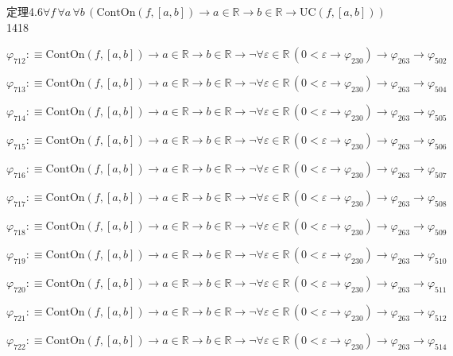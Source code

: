 \begin{fullproof}{定理4.6}{$\forall f\,\forall a\,\forall b\,(\mathrm{ContOn}(f,[a,b]) \to a \in \mathbb{R} \to b \in \mathbb{R} \to \mathrm{UC}(f,[a,b]))$}{1418}
\begin{abbrevlist}
\item $\varphi_{712} :\equiv \mathrm{ContOn}(f,[a,b]) \to a \in \mathbb{R} \to b \in \mathbb{R} \to \neg \forall \varepsilon \in \mathbb{R}\,(0 < \varepsilon \to \varphi_{230}) \to \varphi_{263} \to \varphi_{502}$
\item $\varphi_{713} :\equiv \mathrm{ContOn}(f,[a,b]) \to a \in \mathbb{R} \to b \in \mathbb{R} \to \neg \forall \varepsilon \in \mathbb{R}\,(0 < \varepsilon \to \varphi_{230}) \to \varphi_{263} \to \varphi_{504}$
\item $\varphi_{714} :\equiv \mathrm{ContOn}(f,[a,b]) \to a \in \mathbb{R} \to b \in \mathbb{R} \to \neg \forall \varepsilon \in \mathbb{R}\,(0 < \varepsilon \to \varphi_{230}) \to \varphi_{263} \to \varphi_{505}$
\item $\varphi_{715} :\equiv \mathrm{ContOn}(f,[a,b]) \to a \in \mathbb{R} \to b \in \mathbb{R} \to \neg \forall \varepsilon \in \mathbb{R}\,(0 < \varepsilon \to \varphi_{230}) \to \varphi_{263} \to \varphi_{506}$
\item $\varphi_{716} :\equiv \mathrm{ContOn}(f,[a,b]) \to a \in \mathbb{R} \to b \in \mathbb{R} \to \neg \forall \varepsilon \in \mathbb{R}\,(0 < \varepsilon \to \varphi_{230}) \to \varphi_{263} \to \varphi_{507}$
\item $\varphi_{717} :\equiv \mathrm{ContOn}(f,[a,b]) \to a \in \mathbb{R} \to b \in \mathbb{R} \to \neg \forall \varepsilon \in \mathbb{R}\,(0 < \varepsilon \to \varphi_{230}) \to \varphi_{263} \to \varphi_{508}$
\item $\varphi_{718} :\equiv \mathrm{ContOn}(f,[a,b]) \to a \in \mathbb{R} \to b \in \mathbb{R} \to \neg \forall \varepsilon \in \mathbb{R}\,(0 < \varepsilon \to \varphi_{230}) \to \varphi_{263} \to \varphi_{509}$
\item $\varphi_{719} :\equiv \mathrm{ContOn}(f,[a,b]) \to a \in \mathbb{R} \to b \in \mathbb{R} \to \neg \forall \varepsilon \in \mathbb{R}\,(0 < \varepsilon \to \varphi_{230}) \to \varphi_{263} \to \varphi_{510}$
\item $\varphi_{720} :\equiv \mathrm{ContOn}(f,[a,b]) \to a \in \mathbb{R} \to b \in \mathbb{R} \to \neg \forall \varepsilon \in \mathbb{R}\,(0 < \varepsilon \to \varphi_{230}) \to \varphi_{263} \to \varphi_{511}$
\item $\varphi_{721} :\equiv \mathrm{ContOn}(f,[a,b]) \to a \in \mathbb{R} \to b \in \mathbb{R} \to \neg \forall \varepsilon \in \mathbb{R}\,(0 < \varepsilon \to \varphi_{230}) \to \varphi_{263} \to \varphi_{512}$
\item $\varphi_{722} :\equiv \mathrm{ContOn}(f,[a,b]) \to a \in \mathbb{R} \to b \in \mathbb{R} \to \neg \forall \varepsilon \in \mathbb{R}\,(0 < \varepsilon \to \varphi_{230}) \to \varphi_{263} \to \varphi_{514}$

\end{abbrevlist}
\end{fullproof}
